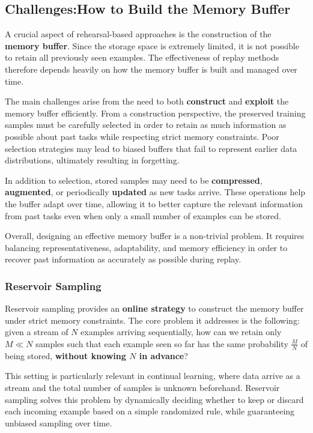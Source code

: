 \subsection{Challenges:How to Build the Memory Buffer}

A crucial aspect of rehearsal-based approaches is the construction of the
\textbf{memory buffer}. Since the storage space is extremely limited, it is not
possible to retain all previously seen examples. The effectiveness of replay
methods therefore depends heavily on how the memory buffer is built and managed
over time.

The main challenges arise from the need to both \textbf{construct} and
\textbf{exploit} the memory buffer efficiently. From a construction perspective,
the preserved training samples must be carefully selected in order to retain as
much information as possible about past tasks while respecting strict memory
constraints. Poor selection strategies may lead to biased buffers that fail to
represent earlier data distributions, ultimately resulting in forgetting.

In addition to selection, stored samples may need to be \textbf{compressed},
\textbf{augmented}, or periodically \textbf{updated} as new tasks arrive. These
operations help the buffer adapt over time, allowing it to better capture the
relevant information from past tasks even when only a small number of examples
can be stored.

Overall, designing an effective memory buffer is a non-trivial problem. It
requires balancing representativeness, adaptability, and memory efficiency in
order to recover past information as accurately as possible during replay.

\subsubsection{Reservoir Sampling}

Reservoir sampling provides an \textbf{online strategy} to construct the memory buffer
under strict memory constraints. The core problem it addresses is the following: given
a stream of $N$ examples arriving sequentially, how can we retain only $M \ll N$ samples
such that each example seen so far has the same probability $\frac{M}{N}$ of being stored,
\textbf{without knowing $N$ in advance}?

This setting is particularly relevant in continual learning, where data arrive as a
stream and the total number of samples is unknown beforehand. Reservoir sampling solves
this problem by dynamically deciding whether to keep or discard each incoming example
based on a simple randomized rule, while guaranteeing unbiased sampling over time.

